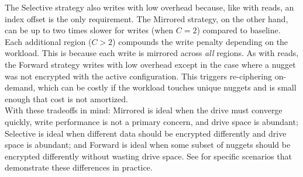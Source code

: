 The Selective strategy also writes with low overhead because, like with reads,
an index offset is the only requirement. The Mirrored strategy, on the other
hand, can be up to two times slower for writes (when $C = 2$) compared to
baseline. Each additional region ($C > 2$) compounds the write penalty depending
on the workload. This is because each write is mirrored across \emph{all}
regions. As with reads, the Forward strategy writes with low overhead except in
the case where a nugget was not encrypted with the active configuration. This
triggers re-ciphering on-demand, which can be costly if the workload touches
unique nuggets and is small enough that cost is not amortized.\\

With these tradeoffs in mind: Mirrored is ideal when the drive must converge
quickly, write performance is not a primary concern, and drive space is
abundant; Selective is ideal when different data should be encrypted differently
and drive space is abundant; and Forward is ideal when some subset of nuggets
should be encrypted differently without wasting drive space. See
 for specific scenarios that demonstrate these differences in
practice.

